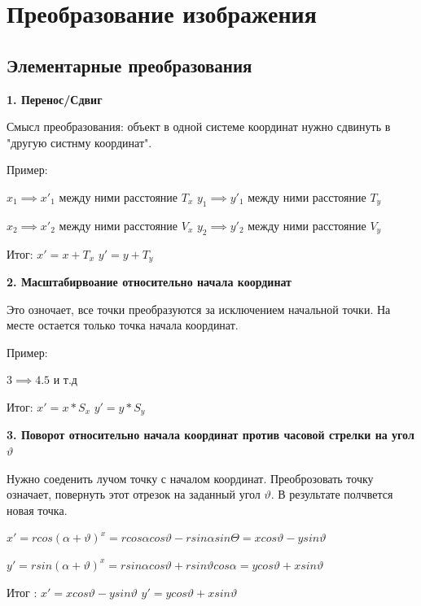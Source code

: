 \documentclass{article}
\begin{document}
\section{Преобразование изображения}
\subsection{Элементарные преобразования}

\textbf{1. Перенос/Сдвиг}

Смысл преобразования: объект в одной системе координат 
нужно сдвинуть в "другую систнму координат".

Пример: 

$x_1 \implies x'_1$ между ними расстояние $T_x$ \hspace{5mm} $y_1 \implies y'_1$ между ними расстояние $T_y$

$x_2 \implies x'_2$ между ними расстояние $V_x$ \hspace{5mm} $y_2 \implies y'_2$ между ними расстояние $V_y$


Итог: $x'=x+T_x$ \hspace{5mm} $y'=y+T_y$

\vspace{5mm}

\textbf{2. Масштабирвоание относительно начала координат}

Это озночает, все точки преобразуются за исключением начальной точки.
На месте остается только точка начала координат.

Пример:

$3 \implies 4.5$ и т.д

Итог: $x'=x*S_x$ \hspace{5mm} $y'=y*S_y$ 

\vspace{5mm}

\textbf{3. Поворот относительно начала координат против часовой стрелки на угол $\vartheta$}

Нужно соеденить лучом точку с началом координат. Преоброзовать точку означает, повернуть этот
отрезок на заданный угол $\vartheta$. В результате полчвется новая точка.

$x' = r cos(\alpha + \vartheta)^x = r cos \alpha cos \vartheta - r sin \alpha sin \varTheta
= x cos \vartheta - y sin \vartheta$

$y' = r sin(\alpha + \vartheta)^x = r sin \alpha cos \vartheta + r sin \vartheta cos \alpha
= y cos \vartheta + x sin \vartheta$

Итог : $x' = x cos \vartheta - y sin \vartheta$ \hspace{5mm}$y'= y cos \vartheta + x sin \vartheta$
\end{document}
